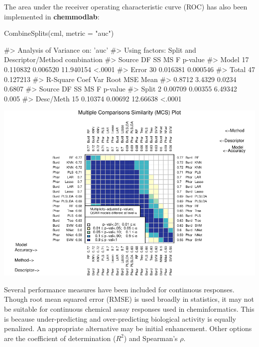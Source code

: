 The area under the receiver operating characteristic curve (ROC) has
also been implemented in \textbf{chemmodlab}:

\begin{Schunk}
\begin{Sinput}
CombineSplits(cml, metric = "auc")
\end{Sinput}
\begin{Soutput}
#>    Analysis of Variance on: 'auc'
#>  Using factors: Split and Descriptor/Method combination
#> Source    DF          SS          MS           F   p-value   
#> Model     17    0.110832    0.006520   11.940154    <.0001   
#> Error     30    0.016381    0.000546   
#> Total     47    0.127213   
#>       R-Square   Coef Var   Root MSE       Mean   
#>         0.8712     3.4329     0.0234     0.6807   
#> Source       DF         SS         MS          F   p-value   
#> Split         2    0.00709    0.00355    6.49342     0.005   
#> Desc/Meth    15    0.10374    0.00692   12.66638    <.0001
\end{Soutput}

\includegraphics{chemmodlabRJournal_files/figure-latex/CombineSplits_auc-1} \end{Schunk}

Several performance measures have been included for continuous
responses. Though root mean squared error (RMSE) is used broadly in
statistics, it may not be suitable for continuous chemical assay
responses used in cheminformatics. This is because under-predicting and
over-predicting biological activity is equally penalized. An appropriate
alternative may be initial enhancement. Other options are the
coefficient of determination (\(R^2\)) and Spearman's \(\rho\).

